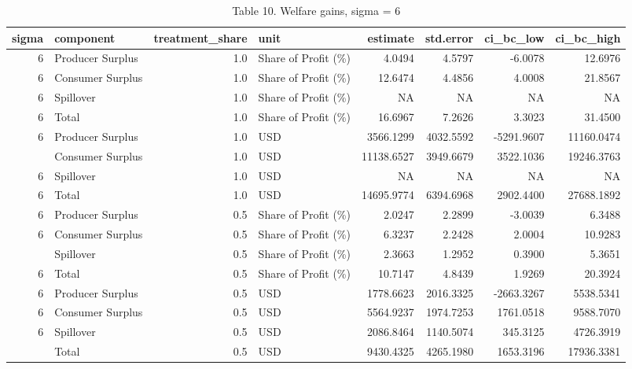\begin{table}

\caption{Table 10. Welfare gains, sigma = 6}
\centering
\begin{tabular}[t]{rlrlrrrr}
\toprule
sigma & component & treatment\_share & unit & estimate & std.error & ci\_bc\_low & ci\_bc\_high\\
\midrule
6 & Producer Surplus & 1.0 & Share of Profit (\%) & 4.0494 & 4.5797 & -6.0078 & 12.6976\\
6 & Consumer Surplus & 1.0 & Share of Profit (\%) & 12.6474 & 4.4856 & 4.0008 & 21.8567\\
6 & Spillover & 1.0 & Share of Profit (\%) & NA & NA & NA & NA\\
6 & Total & 1.0 & Share of Profit (\%) & 16.6967 & 7.2626 & 3.3023 & 31.4500\\
6 & Producer Surplus & 1.0 & USD & 3566.1299 & 4032.5592 & -5291.9607 & 11160.0474\\
\addlinespace
6 & Consumer Surplus & 1.0 & USD & 11138.6527 & 3949.6679 & 3522.1036 & 19246.3763\\
6 & Spillover & 1.0 & USD & NA & NA & NA & NA\\
6 & Total & 1.0 & USD & 14695.9774 & 6394.6968 & 2902.4400 & 27688.1892\\
6 & Producer Surplus & 0.5 & Share of Profit (\%) & 2.0247 & 2.2899 & -3.0039 & 6.3488\\
6 & Consumer Surplus & 0.5 & Share of Profit (\%) & 6.3237 & 2.2428 & 2.0004 & 10.9283\\
\addlinespace
6 & Spillover & 0.5 & Share of Profit (\%) & 2.3663 & 1.2952 & 0.3900 & 5.3651\\
6 & Total & 0.5 & Share of Profit (\%) & 10.7147 & 4.8439 & 1.9269 & 20.3924\\
6 & Producer Surplus & 0.5 & USD & 1778.6623 & 2016.3325 & -2663.3267 & 5538.5341\\
6 & Consumer Surplus & 0.5 & USD & 5564.9237 & 1974.7253 & 1761.0518 & 9588.7070\\
6 & Spillover & 0.5 & USD & 2086.8464 & 1140.5074 & 345.3125 & 4726.3919\\
\addlinespace
6 & Total & 0.5 & USD & 9430.4325 & 4265.1980 & 1653.3196 & 17936.3381\\
\bottomrule
\end{tabular}
\end{table}
